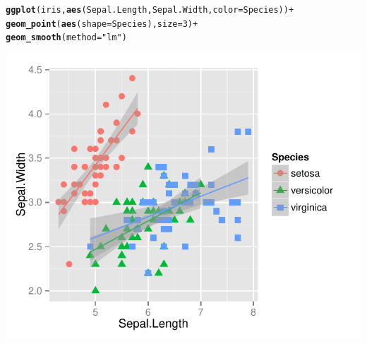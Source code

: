 \documentclass{beamer}\usepackage[]{graphicx}\usepackage[]{color}
\makeatletter
\newcommand{\hlnum}[1]{\textcolor[rgb]{0.686,0.059,0.569}{#1}}%
\newcommand{\hlstr}[1]{\textcolor[rgb]{0.192,0.494,0.8}{#1}}%
\newcommand{\hlopt}[1]{\textcolor[rgb]{0,0,0}{#1}}%
\newcommand{\hlstd}[1]{\textcolor[rgb]{0.345,0.345,0.345}{#1}}%
\newcommand{\hlkwc}[1]{\textcolor[rgb]{0.333,0.667,0.333}{#1}}%
\newcommand{\hlkwd}[1]{\textcolor[rgb]{0.737,0.353,0.396}{\textbf{#1}}}%
\newenvironment{kframe}{%
 \def\at@end@of@kframe{}%
 \ifinner\ifhmode%
  \def\at@end@of@kframe{\end{minipage}}%
  \begin{minipage}{\columnwidth}%
 \fi\fi%
 \def\FrameCommand##1{\hskip\@totalleftmargin \hskip-\fboxsep
 \colorbox{shadecolor}{##1}\hskip-\fboxsep
     \hskip-\linewidth \hskip-\@totalleftmargin \hskip\columnwidth}%
 \MakeFramed {\advance\hsize-\width
   \@totalleftmargin\z@ \linewidth\hsize
   \@setminipage}}%
 {\par\unskip\endMakeFramed%
 \at@end@of@kframe}
\newenvironment{knitrout}{}{} %
\makeatother
\begin{document}
\begin{frame}[fragile]
\begin{knitrout}\footnotesize
{}\color{fgcolor}\begin{kframe}
\begin{alltt}
\hlkwd{ggplot}\hlstd{(iris,} \hlkwd{aes}\hlstd{(Sepal.Length, Sepal.Width,} \hlkwc{color} \hlstd{= Species))} \hlopt{+}
\hlkwd{geom_point}\hlstd{(}\hlkwd{aes}\hlstd{(}\hlkwc{shape} \hlstd{= Species),} \hlkwc{size} \hlstd{=} \hlnum{3}\hlstd{)} \hlopt{+}
\hlkwd{geom_smooth}\hlstd{(}\hlkwc{method} \hlstd{=} \hlstr{"lm"}\hlstd{)}
\end{alltt}
\end{kframe}

{\centering \includegraphics[width=.75\linewidth]{figure/adding_stats_} 

}



\end{knitrout}
\end{frame}

\end{document}
